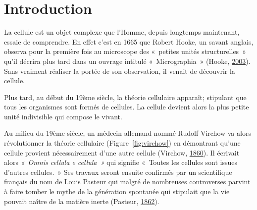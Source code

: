 \documentclass[12pt,a4paper,twoside,openright]{book}
\begin{document}
\clearpage\null
\mainmatter

\chapter{Introduction}\label{introduction}

La cellule est un objet complexe que l'Homme, depuis longtemps
maintenant, essaie de comprendre. En effet c'est en 1665 que Robert
Hooke, un savant anglais, observa pour la première fois au microscope
des «~petites unités structurelles~» qu'il décrira plus tard dans un
ouvrage intitulé «~Micrographia~» (Hooke,
\protect\hyperlink{ref-hooke2003micrographia}{2003}). Sans vraiment
réaliser la portée de son observation, il venait de découvrir la
cellule.

Plus tard, au début du 19ème siècle, la théorie cellulaire apparaît;
stipulant que tous les organismes sont formés de cellules. La cellule
devient alors la plus petite unité indivisible qui compose le vivant.

Au milieu du 19ème siècle, un médecin allemand nommé Rudolf Virchow va
alors révolutionner la théorie cellulaire (Figure~\ref{fig:virchow}) en
démontrant qu'une cellule provient nécessairement d'une autre cellule
(Virchow, \protect\hyperlink{ref-virchow1860cellular}{1860}). Il
écrivait alors \emph{«~Omnis cellula e cellula~»} qui signifie «~Toutes
les cellules sont issues d'autres cellules.~» Ses travaux seront ensuite
confirmés par un scientifique français du nom de Louis Pasteur qui
malgré de nombreuses controverses parvint à faire tomber le mythe de la
génération spontanée qui stipulait que la vie pouvait naître de la
matière inerte (Pasteur, \protect\hyperlink{ref-Pasteur}{1862}).
\end{document}
